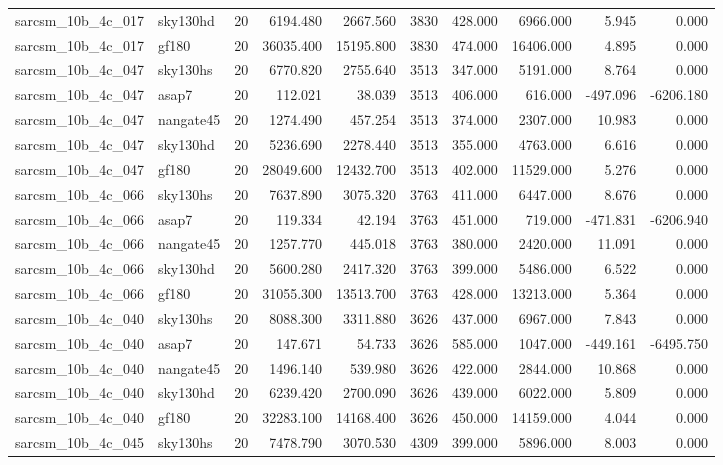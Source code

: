\documentclass{article}
\begin{document}
\begin{longtable}{llrrrrrrrr}
sarcsm\_10b\_4c\_017 & sky130hd & 20 & 6194.480 & 2667.560 & 3830 & 428.000 & 6966.000 & 5.945 & 0.000 \\
sarcsm\_10b\_4c\_017 & gf180 & 20 & 36035.400 & 15195.800 & 3830 & 474.000 & 16406.000 & 4.895 & 0.000 \\
sarcsm\_10b\_4c\_047 & sky130hs & 20 & 6770.820 & 2755.640 & 3513 & 347.000 & 5191.000 & 8.764 & 0.000 \\
sarcsm\_10b\_4c\_047 & asap7 & 20 & 112.021 & 38.039 & 3513 & 406.000 & 616.000 & -497.096 & -6206.180 \\
sarcsm\_10b\_4c\_047 & nangate45 & 20 & 1274.490 & 457.254 & 3513 & 374.000 & 2307.000 & 10.983 & 0.000 \\
sarcsm\_10b\_4c\_047 & sky130hd & 20 & 5236.690 & 2278.440 & 3513 & 355.000 & 4763.000 & 6.616 & 0.000 \\
sarcsm\_10b\_4c\_047 & gf180 & 20 & 28049.600 & 12432.700 & 3513 & 402.000 & 11529.000 & 5.276 & 0.000 \\
sarcsm\_10b\_4c\_066 & sky130hs & 20 & 7637.890 & 3075.320 & 3763 & 411.000 & 6447.000 & 8.676 & 0.000 \\
sarcsm\_10b\_4c\_066 & asap7 & 20 & 119.334 & 42.194 & 3763 & 451.000 & 719.000 & -471.831 & -6206.940 \\
sarcsm\_10b\_4c\_066 & nangate45 & 20 & 1257.770 & 445.018 & 3763 & 380.000 & 2420.000 & 11.091 & 0.000 \\
sarcsm\_10b\_4c\_066 & sky130hd & 20 & 5600.280 & 2417.320 & 3763 & 399.000 & 5486.000 & 6.522 & 0.000 \\
sarcsm\_10b\_4c\_066 & gf180 & 20 & 31055.300 & 13513.700 & 3763 & 428.000 & 13213.000 & 5.364 & 0.000 \\
sarcsm\_10b\_4c\_040 & sky130hs & 20 & 8088.300 & 3311.880 & 3626 & 437.000 & 6967.000 & 7.843 & 0.000 \\
sarcsm\_10b\_4c\_040 & asap7 & 20 & 147.671 & 54.733 & 3626 & 585.000 & 1047.000 & -449.161 & -6495.750 \\
sarcsm\_10b\_4c\_040 & nangate45 & 20 & 1496.140 & 539.980 & 3626 & 422.000 & 2844.000 & 10.868 & 0.000 \\
sarcsm\_10b\_4c\_040 & sky130hd & 20 & 6239.420 & 2700.090 & 3626 & 439.000 & 6022.000 & 5.809 & 0.000 \\
sarcsm\_10b\_4c\_040 & gf180 & 20 & 32283.100 & 14168.400 & 3626 & 450.000 & 14159.000 & 4.044 & 0.000 \\
sarcsm\_10b\_4c\_045 & sky130hs & 20 & 7478.790 & 3070.530 & 4309 & 399.000 & 5896.000 & 8.003 & 0.000 \\

\end{longtable}
\end{document}
